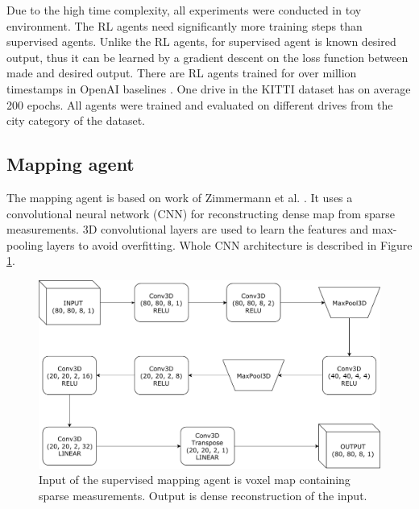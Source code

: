 \clearpage
Due to the high time complexity, all experiments were conducted in toy environment. The RL agents need significantly more training steps than supervised agents. Unlike the RL agents, for supervised agent is known desired output, thus it can be learned by a gradient descent on the loss function between made and desired output. There are RL agents trained for over million timestamps in OpenAI baselines \cite{openai2017}. One drive in the KITTI dataset has on average 200 epochs. All agents were trained and evaluated on different drives from the city category of the dataset.

\subsection{Mapping agent}
The mapping agent is based on work of Zimmermann et al. \cite{zimmermann2017}. It uses a convolutional neural network (CNN) for reconstructing dense map from sparse measurements. 3D convolutional layers are used to learn the features and max-pooling layers to avoid overfitting. Whole CNN architecture is described in Figure \ref{fig:supervised}.
\vspace{3mm}
\begin{figure}[!h]
\centering
\includegraphics[scale=0.6]{fig/supervised.pdf}
\caption[Mapping network architecture]{Input of the supervised mapping agent is voxel map containing sparse measurements. Output is dense reconstruction of the input.}
\label{fig:supervised}
\end{figure}

